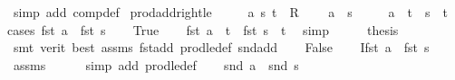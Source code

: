 \begin{isabellebody}
\ {\isacharparenleft}{\kern0pt}simp\ add{\isacharcolon}{\kern0pt}\ comp{\isacharunderscore}{\kern0pt}def{\isacharparenright}{\kern0pt}%
\endisatagproof
{\isafoldproof}%
%
\isadelimproof
\isanewline
%
\endisadelimproof
\isanewline
{}\isamarkupfalse%
\ prod{\isacharunderscore}{\kern0pt}addright{\isacharunderscore}{\kern0pt}le{\isacharcolon}{\kern0pt}\isanewline
\ \ \ \ \ a\ s\ t\ {\isacharcolon}{\kern0pt}{\isacharcolon}{\kern0pt}\ R{}\ \isanewline
\ \ \ {\isachardoublequoteopen}a\ {\isasymle}\ s{\isachardoublequoteclose}\isanewline
\ \ \ \ \ {\isachardoublequoteopen}a\ {\isacharplus}{\kern0pt}\ t\ {\isasymle}\ s\ {\isacharplus}{\kern0pt}\ t{\isachardoublequoteclose}\isanewline
%
\isadelimproof
%
\endisadelimproof
%
\isatagproof
{}\isamarkupfalse%
{\isacharparenleft}{\kern0pt}cases\ {\isachardoublequoteopen}fst\ a\ {\isacharless}{\kern0pt}\ fst\ s{\isachardoublequoteclose}{\isacharparenright}{\kern0pt}\isanewline
\ \ \isamarkupfalse%
\ True\isanewline
\ \ \isamarkupfalse%
\ {\isachardoublequoteopen}fst\ {\isacharparenleft}{\kern0pt}a\ {\isacharplus}{\kern0pt}\ t{\isacharparenright}{\kern0pt}\ {\isacharless}{\kern0pt}\ fst\ {\isacharparenleft}{\kern0pt}s\ {\isacharplus}{\kern0pt}\ t{\isacharparenright}{\kern0pt}{\isachardoublequoteclose}\ \isamarkupfalse%
\ simp\isanewline
\ \ \isamarkupfalse%
\ \isamarkupfalse%
\ {\isacharquery}{\kern0pt}thesis\isanewline
\ \ \ \ \isamarkupfalse%
\ {\isacharparenleft}{\kern0pt}smt\ {\isacharparenleft}{\kern0pt}verit{\isacharcomma}{\kern0pt}\ best{\isacharparenright}{\kern0pt}\ assms\ fst{\isacharunderscore}{\kern0pt}add\ prod{\isacharunderscore}{\kern0pt}le{\isacharunderscore}{\kern0pt}def\ snd{\isacharunderscore}{\kern0pt}add{\isacharparenright}{\kern0pt}\isanewline
{}\isamarkupfalse%
\isanewline
\ \ \isamarkupfalse%
\ False\isanewline
\ \ \isamarkupfalse%
\ I{}{\isacharcolon}{\kern0pt}{\isachardoublequoteopen}fst\ a\ {\isacharequal}{\kern0pt}\ fst\ s{\isachardoublequoteclose}\ \isamarkupfalse%
\ assms\isanewline
\ \ \ \ \isamarkupfalse%
\ {\isacharparenleft}{\kern0pt}simp\ add{\isacharcolon}{\kern0pt}\ prod{\isacharunderscore}{\kern0pt}le{\isacharunderscore}{\kern0pt}def{\isacharparenright}{\kern0pt}\isanewline
\ \ \isamarkupfalse%
\ {\isachardoublequoteopen}snd\ a\ {\isasymle}\ snd\ s{\isachardoublequoteclose}\ \isamarkupfalse%

\end{isabellebody}
